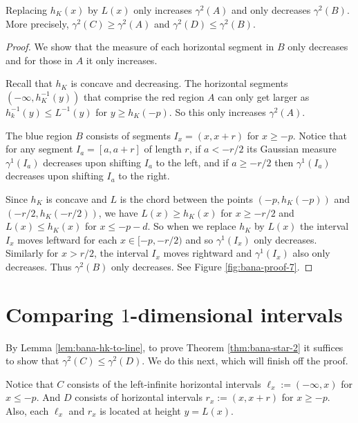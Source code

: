 \begin{lemma}
\label{lem:bana-hk-to-line}
Replacing $h_K(x)$ by $L(x)$ only increases $\gamma^2(A)$ and only decreases $\gamma^2(B)$. More precisely,
 $\gamma^2(C) \geq \gamma^2(A)$ and   $\gamma^2(D) \leq \gamma^2(B)$.
\end{lemma}
\begin{proof}
We show that the measure of each horizontal segment in $B$ only decreases and for those in $A$ it only increases.

Recall that $h_K$ is concave and decreasing.
The horizontal segments $(-\infty,h_K^{-1}(y))$ that comprise the red region $A$ can only get larger as $h_k^{-1}(y) \leq L^{-1}(y)$ for $y \geq h_K(-p)$. So this only increases $\gamma^2(A)$.

The blue region $B$ consists of segments $I_x=(x,x+r)$ for $x \geq -p$.
Notice that for any segment $I_a = [a,a+r]$ of length $r$, if $a < -r/2$ its Gaussian measure $\gamma^1(I_a)$ decreases 
 upon shifting $I_a$ to the left, and if $a\geq  -r/2$ then $\gamma^1(I_a)$ decreases upon shifting $I_a$ to the right.

Since $h_K$ is concave and $L$ is the chord between the points $(-p,h_K(-p))$ and $(-r/2,h_K(-r/2))$, we have $L(x)\ge h_K(x)$ for $x\ge -r/2$ and $L(x)\le h_K(x)$ for $x\le -p-d$.
So when we replace $h_K$ by $L(x)$ the interval $I_x$ moves leftward for each $x \in [-p,-r/2)$  and so $\gamma^1(I_x)$ only decreases. Similarly for $x > r/2$,  the interval $I_x$ moves rightward and $\gamma^1(I_x)$ also only decreases. Thus $\gamma^2(B)$ only decreases.  See Figure \ref{fig:bana-proof-7}.
\end{proof}


\section{Comparing $1$-dimensional intervals}
\label{sec:bana-proof-comparing-1-dim-intervals}
By Lemma \ref{lem:bana-hk-to-line}, to prove Theorem \ref{thm:bana-star-2} it suffices to show that $\gamma^2(C) \leq \gamma^2(D)$. We do this next, which will finish off the proof.

 Notice that $C$ consists of the left-infinite horizontal intervals $\ell_{x} := (-\infty,x)$ for $x\leq -p$.
And $D$ consists of horizontal intervals  $r_x := (x,x+r)$ for $x \geq -p$.
Also, each $\ell_x$ and $r_x$ is located at height $y=L(x)$.

